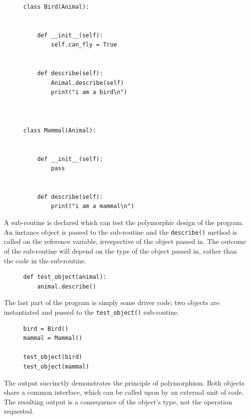 \documentclass[9pt]{article}
\begin{document}
\begin{figure}[H]
\begin{verbatim}
class Bird(Animal):


    def __init__(self):
        self.can_fly = True


    def describe(self):
        Animal.describe(self)
        print("i am a bird\n")



class Mammal(Animal):


    def __init__(self):
        pass


    def describe(self):
        print("i am a mammal\n")
\end{verbatim}
\end{figure}

A sub-routine is declared which can test the polymorphic design of the program. An instance object is passed to the sub-routine and the \texttt{describe()} method is called on the reference variable, irrespective of the object passed in. The outcome of the sub-routine will depend on the type of the object passed in, rather than the code in the sub-routine.

\begin{figure}[H]
\begin{verbatim}
def test_object(animal):
    animal.describe()
\end{verbatim}
\end{figure}

The last part of the program is simply some driver code; two objects are instantiated and passed to the \texttt{test\_object()} sub-routine.

\begin{figure}[H]
\begin{verbatim}
bird = Bird()
mammal = Mammal()

test_object(bird)
test_object(mammal)
\end{verbatim}
\end{figure}

The output succinctly demonstrates the principle of polymorphism. Both objects share a common interface, which can be called upon by an external unit of code. The resulting output is a consequence of the object's type, not the operation requested.
\end{document}
